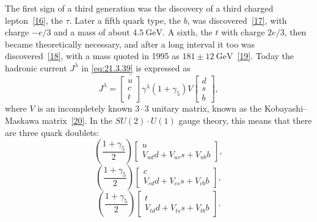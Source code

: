 The first sign of a third generation was the discovery of a third charged lepton~\hyperref[ch21-ref-16]{[16]}, the $\tau$. Later a fifth quark type, the $b$, was discovered~\hyperref[ch21-ref-17]{[17]}, with charge $-e/3$ and a mass of about $4.5\ \mathrm{GeV}$. A sixth, the $t$ with charge $2e/3$, then became theoretically necessary, and after a long interval it too was discovered~\hyperref[ch21-ref-18]{[18]}, with a mass quoted in 1995 as $181\mathbin{\pm}12\ \mathrm{GeV}$~\hyperref[ch21-ref-19]{[19]}. Today the hadronic current $J^\lambda$ in \eqref{eq:21.3.39} is expressed as
\begin{equation}
J^\lambda
=
\overline{\begin{bmatrix}u\\c\\t\end{bmatrix}}
\gamma^\lambda(1+\gamma_5)V
\begin{bmatrix}d\\s\\b\end{bmatrix},
\tag{21.3.45}\label{eq:21.3.45}
\end{equation}
where $V$ is an incompletely known $3\mathbin{\cdot}3$ unitary matrix, known as the Kobayashi--Maskawa matrix~\hyperref[ch21-ref-20]{[20]}. In the $SU(2)\cdot U(1)$ gauge theory, this means that there are three quark doublets:
\begin{equation}
\left(\frac{1+\gamma_5}{2}\right)
\begin{bmatrix}
u\\
V_{ud}d+V_{us}s+V_{ub}b
\end{bmatrix},
\tag{21.3.46}\label{eq:21.3.46}
\end{equation}
\begin{equation}
\left(\frac{1+\gamma_5}{2}\right)
\begin{bmatrix}
c\\
V_{cd}d+V_{cs}s+V_{cb}b
\end{bmatrix},
\tag{21.3.47}\label{eq:21.3.47}
\end{equation}
\begin{equation}
\left(\frac{1+\gamma_5}{2}\right)
\begin{bmatrix}
t\\
V_{td}d+V_{ts}s+V_{tb}b
\end{bmatrix}.
\tag{21.3.48}\label{eq:21.3.48}
\end{equation}

